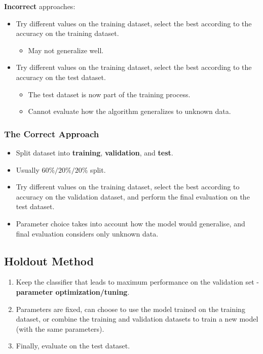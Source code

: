 \documentclass[11pt]{article}
\begin{document}
\textbf{Incorrect} approaches:
\begin{itemize}
  \item Try different values on the training dataset, select the best according to the accuracy on the training dataset.
    \begin{itemize}
      \item May not generalize well.
    \end{itemize}
  \item Try different values on the training dataset, select the best according to the accuracy on the test dataset.
    \begin{itemize}
      \item The test dataset is now part of the training process.
      \item Cannot evaluate how the algorithm generalizes to unknown data.
    \end{itemize}
\end{itemize}

\subsubsection{The Correct Approach}
\begin{itemize}
  \item Split dataset into \textbf{training}, \textbf{validation}, and \textbf{test}.
  \item Usually $60\%/20\%/20\%$ split.
  \item Try different values on the training dataset, select the best according to accuracy on the validation dataset, and perform the final evaluation on the test dataset.
  \item Parameter choice takes into account how the model would generalise, and final evaluation considers only unknown data.
\end{itemize}

\subsection{Holdout Method}
\begin{enumerate}
  \item Keep the classifier that leads to maximum performance on the validation set - \textbf{parameter optimization/tuning}.
  \item Parameters are fixed, can choose to use the model trained on the training dataset, or combine the training and validation datasets to train a new model (with the same parameters).
  \item Finally, evaluate on the test dataset.
\end{enumerate}
\end{document}
